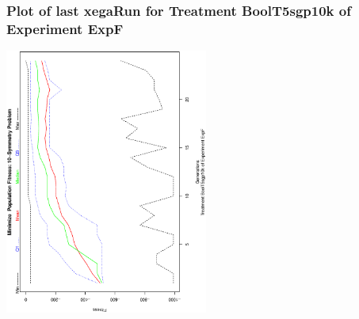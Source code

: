  \begin{frame}
 \frametitle{ Plot of last xegaRun for Treatment BoolT5sgp10k of Experiment ExpF }
 \begin{center}
\includegraphics[width=0.5\textwidth, angle=-90]
{ExpFPlotPopStatsFigure000.eps}
 \end{center}
 \label{report/ExpFPlotPopStatsFigure000.eps}  
 \end{frame}

